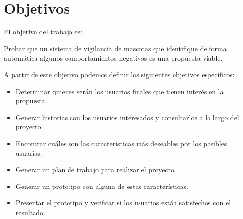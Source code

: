 \section{Objetivos}
\label{sec:objetivos}


El objetivo del trabajo es:

\begin{quotebox}
  Probar que un sistema de vigilancia de mascotas que identifique de forma automática algunos comportamientos negativos es una propuesta viable.
\end{quotebox}


A partir de este objetivo podemos definir los siguientes objetivos específicos:

\begin{itemize}
  \item Determinar quienes serán los usuarios finales que tienen interés en la propuesta.
  \item Generar historias con los usuarios interesados y consultarlos a lo largo del proyecto
  \item Encontrar cuáles son las características más deseables por los posibles usuarios.
  \item Generar un plan de trabajo para realizar el proyecto.
  \item Generar un prototipo con alguna de estas características.
  \item Presentar el prototipo y verificar si los usuarios están satisfechos con el resultado.
\end{itemize}




